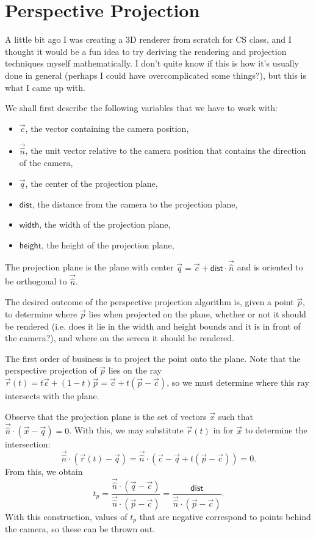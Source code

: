 \documentclass[a4paper, 12pt]{article}
\begin{document}
\section*{Perspective Projection}

A little bit ago I was creating a 3D renderer from scratch for CS class, and I thought it would be a fun idea to try deriving the rendering and projection techniques myself mathematically. I don't quite know if this is how it's usually done in general (perhaps I could have overcomplicated some things?), but this is what I came up with.

We shall first describe the following variables that we have to work with:
\begin{itemize}
    \item \( \vec{c} \), the vector containing the camera position,
    \item \( \vec{\hat n} \), the unit vector relative to the camera position that contains the direction of the camera,
    \item \( \vec{q} \), the center of the projection plane,
    \item \( \textsf{dist} \), the distance from the camera to the projection plane,
    \item \( \textsf{width} \), the width of the projection plane,
    \item \( \textsf{height} \), the height of the projection plane,
\end{itemize}

The projection plane is the plane with center \( \vec{q} = \vec{c} + \textsf{dist} \cdot \vec{\hat n} \) and is oriented to be orthogonal to \( \vec{\hat n} \).

The desired outcome of the perspective projection algorithm is, given a point \( \vec{p} \), to determine where \( \vec{p} \) lies when projected on the plane, whether or not it should be rendered (i.e. does it lie in the width and height bounds and it is in front of the camera?), and where on the screen it should be rendered.

The first order of business is to project the point onto the plane. Note that the perspective projection of \( \vec{p} \) lies on the ray \( \vec{r} (t) = t\vec{c} + (1 - t) \vec{p} = \vec{c} + t (\vec{p} - \vec{c}) \), so we must determine where this ray intersects with the plane.

Observe that the projection plane is the set of vectors \( \vec{x} \) such that \( \vec{\hat n} \cdot (\vec{x} - \vec{q}) = 0 \). With this, we may substitute \( \vec{r}(t) \) in for \( \vec{x} \) to determine the intersection:
\[
    \vec{\hat n} \cdot (\vec{r}(t) - \vec{q}) = \vec{\hat n} \cdot (\vec{c} - \vec{q} + t(\vec{p} - \vec{c})) = 0
.\]
From this, we obtain
\[
    t_p = \frac{\vec{\hat n} \cdot (\vec{q} - \vec{c})}{\vec{\hat n} \cdot (\vec{p} - \vec{c})} = \frac{\textsf{dist}}{\vec{\hat n} \cdot (\vec{p} - \vec{c})}
.\]
With this construction, values of \( t_p \) that are negative correspond to points behind the camera, so these can be thrown out.
\end{document}
